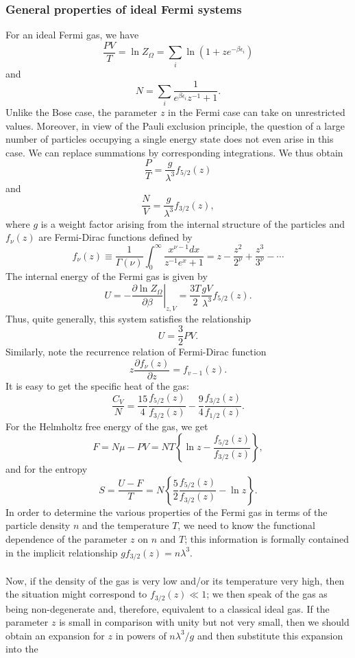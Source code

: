 \subsubsection{General properties of ideal Fermi systems}
For an ideal Fermi gas, we have
\[\frac{PV}{T} = \ln Z_{\Omega} = \sum_i \ln(1+ze^{-\beta\epsilon_i})\]
and
\[N = \sum_i \frac{1}{e^{\beta\epsilon_i}z^{-1} + 1}.\]
Unlike the Bose case, the parameter $z$ in the Fermi case can take on unrestricted values. Moreover, in view of the Pauli exclusion principle, the question of a large number of particles occupying a single energy state does not even arise in this case.  We can replace summations by corresponding integrations. We thus obtain
\[\frac{P}{T} = \frac{g}{\lambda^3}f_{5/2}(z)\]
and
\[\frac{N}{V} =  \frac{g}{\lambda^3}f_{3/2}(z),\]
where $g$ is a weight factor arising from the internal structure of the particles and $f_{\nu}(z)$ are Fermi-Dirac functions defined by
\[f_{\nu}(z) \equiv \frac{1}{\Gamma(\nu)} \int_{0}^{\infty} \frac{x^{\nu-1}dx}{z^{-1}e^x + 1} = z - \frac{z^2}{2^{\nu}} + \frac{z^3}{3^{\nu}} - \cdots\]
The internal energy of the Fermi gas is given by
\[U = - \left. \frac{\partial \ln Z_{\Omega}}{\partial \beta} \right|_{z,V} = \frac{3T}{2} \frac{gV}{\lambda^3} f_{5/2}(z).\]
Thus, quite generally, this system satisfies the relationship
\[U = \frac{3}{2}PV.\]
Similarly, note the recurrence relation of Fermi-Dirac function
\[z\frac{\partial f_{\nu}(z)}{\partial z} = f_{v-1}(z).\]
It is easy to get the specific heat of the gas:
\[\frac{C_V}{N} = \frac{15}{4} \frac{f_{5/2}(z)}{f_{3/2}(z)} -\frac{9}{4} \frac{f_{3/2}(z)}{f_{1/2}(z)}.\]
For the Helmholtz free energy of the gas, we get
\[F = N\mu - PV = NT \left\{ \ln z - \frac{f_{5/2}(z)}{f_{3/2}(z)} \right\},\]
and for the entropy
\[S = \frac{U-F}{T} = N \left\{ \frac{5}{2} \frac{f_{5/2}(z)}{f_{3/2}(z)} - \ln z \right\}.\]
In order to determine the various properties of the Fermi gas in terms of the particle density $n$ and the temperature $T$, we need to know the functional dependence of the parameter $z$ on $n$ and $T$; this information is formally contained in the implicit relationship $g f_{3/2}(z) = n\lambda^3$. 
\\ \\
Now, if the density of the gas is very low and/or its temperature very high, then the situation might correspond to $f_{3/2}(z) \ll 1$; we then speak of the gas as being non-degenerate and, therefore, equivalent to a classical ideal gas.
If the parameter $z$ is small in comparison with unity but not very small, then we should obtain an expansion for $z$ in powers of $n\lambda^3/g$ and then substitute this expansion into the
